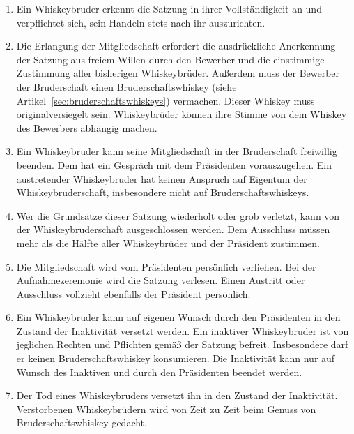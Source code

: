 \documentclass[a4paper,12pt]{scrartcl}
\begin{document}
\begin{enumerate}

\item Ein Whiskeybruder erkennt die  Satzung in ihrer Vollständigkeit an und verpflichtet sich, sein
  Handeln stets nach ihr auszurichten.

\item Die Erlangung der Mitgliedschaft erfordert die ausdrückliche Anerkennung der Satzung aus
  freiem Willen durch den Bewerber und die einstimmige Zustimmung aller bisherigen Whiskeybrüder.
  Außerdem muss der Bewerber der Bruderschaft einen Bruderschaftswhiskey (siehe
  Artikel~\ref{sec:bruderschaftswhiskeys}) vermachen. Dieser Whiskey muss originalversiegelt sein.
  Whiskeybrüder können ihre Stimme von dem Whiskey des Bewerbers abhängig machen.

\item Ein Whiskeybruder kann seine Mitgliedschaft in der Bruderschaft freiwillig beenden. Dem hat
  ein Gespräch mit dem Präsidenten vorauszugehen. Ein austretender Whiskeybruder hat keinen Anspruch
  auf Eigentum der Whiskeybruderschaft, insbesondere nicht auf Bruderschaftswhiskeys.

\item Wer die Grundsätze dieser Satzung wiederholt oder grob verletzt, kann von der
  Whiskeybruderschaft ausgeschlossen werden. Dem Ausschluss müssen mehr als die Hälfte aller
  Whiskeybrüder und der Präsident zustimmen.

\item Die Mitgliedschaft wird vom Präsidenten persönlich verliehen. Bei der Aufnahmezeremonie wird
  die Satzung verlesen. Einen Austritt oder Ausschluss vollzieht ebenfalls der Präsident persönlich.

\item Ein Whiskeybruder kann auf eigenen Wunsch durch den Präsidenten in den Zustand der Inaktivität
  versetzt werden. Ein inaktiver Whiskeybruder ist von jeglichen Rechten und Pflichten gemäß der
  Satzung befreit. Insbesondere darf er keinen Bruderschaftswhiskey konsumieren. Die Inaktivität
  kann nur auf Wunsch des Inaktiven und durch den Präsidenten beendet werden.

\item Der Tod eines Whiskeybruders versetzt ihn in den Zustand der Inaktivität. Verstorbenen
  Whiskeybrüdern wird von Zeit zu Zeit beim Genuss von Bruderschaftswhiskey gedacht.

\end{enumerate}
\end{document}
